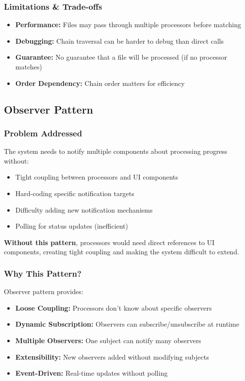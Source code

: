 \documentclass[11pt, a4paper]{article}
\theoremstyle{plain}
\theoremstyle{definition}
\begin{document}
\subsubsection{Limitations \& Trade-offs}

\begin{itemize}
    \item \textbf{Performance:} Files may pass through multiple processors before matching
    \item \textbf{Debugging:} Chain traversal can be harder to debug than direct calls
    \item \textbf{Guarantee:} No guarantee that a file will be processed (if no processor matches)
    \item \textbf{Order Dependency:} Chain order matters for efficiency
\end{itemize}

\subsection{Observer Pattern}

\subsubsection{Problem Addressed}

The system needs to notify multiple components about processing progress without:
    \begin{itemize}
    \item Tight coupling between processors and UI components
    \item Hard-coding specific notification targets
    \item Difficulty adding new notification mechanisms
    \item Polling for status updates (inefficient)
    \end{itemize}

\textbf{Without this pattern}, processors would need direct references to UI components, creating tight coupling and making the system difficult to extend.

\subsubsection{Why This Pattern?}

Observer pattern provides:
\begin{itemize}
    \item \textbf{Loose Coupling:} Processors don't know about specific observers
    \item \textbf{Dynamic Subscription:} Observers can subscribe/unsubscribe at runtime
    \item \textbf{Multiple Observers:} One subject can notify many observers
    \item \textbf{Extensibility:} New observers added without modifying subjects
    \item \textbf{Event-Driven:} Real-time updates without polling
\end{itemize}
\end{document}
